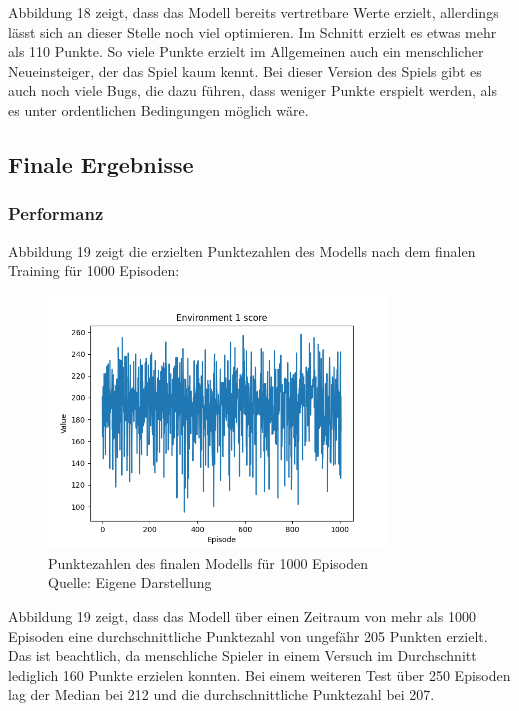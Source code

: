 Abbildung 18 zeigt, dass das Modell bereits vertretbare Werte erzielt, allerdings lässt sich an dieser Stelle noch viel optimieren. Im Schnitt erzielt es etwas mehr als 110 Punkte. So viele Punkte erzielt im Allgemeinen auch ein menschlicher Neueinsteiger, der das Spiel kaum kennt. Bei dieser Version des Spiels gibt es auch noch viele Bugs, die dazu führen, dass weniger Punkte erspielt werden, als es unter ordentlichen Bedingungen möglich wäre.
\subsection{Finale Ergebnisse}
\subsubsection{Performanz}
Abbildung 19 zeigt die erzielten Punktezahlen des Modells nach dem finalen Training für 1000 Episoden:
\nopagebreak
\begin{figure}[H]
	\centering
	\includegraphics[width=0.8\textwidth]{Bilder/maskableppo_ganzschoenclever_193avg_v3.1} 
	\caption[Punktezahlen des finalen Modells für 1000 Episoden]{Punktezahlen des finalen Modells für 1000 Episoden\\ Quelle: Eigene Darstellung}
\end{figure}

Abbildung 19 zeigt, dass das Modell über einen Zeitraum von mehr als 1000 Episoden eine durchschnittliche Punktezahl von ungefähr 205 Punkten erzielt. Das ist beachtlich, da menschliche Spieler in einem Versuch im Durchschnitt lediglich 160 Punkte erzielen konnten. Bei einem weiteren Test über 250 Episoden lag der Median bei 212 und die durchschnittliche Punktezahl bei 207.\\

